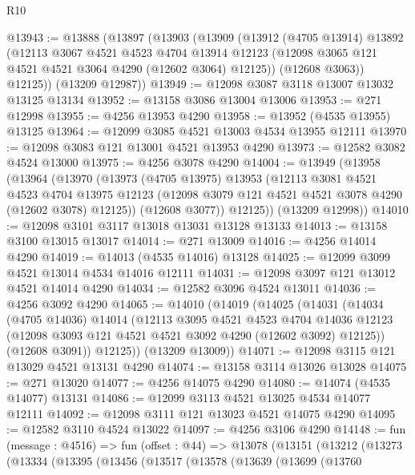 \begin{lexlean}{R10}
\begin{coremodule}
@13943 := @13888
    (@13897
      (@13903
        (@13909
          (@13912
            (@4705 @13914)
            @13892
            (@12113
              @3067
              @4521
              @4523
              @4704
              @13914
              @12123
              (@12098 @3065 @121 @4521 @4521 @3064 @4290 (@12602 @3064) @12125))
            (@12608 @3063))
          @12125))
      (@13209 @12987))
@13949 := @12098 @3087 @3118 @13007 @13032 @13125 @13134
@13952 := @13158 @3086 @13004 @13006
@13953 := @271 @12998
@13955 := @4256 @13953 @4290
@13958 := @13952 (@4535 @13955) @13125
@13964 := @12099 @3085 @4521 @13003 @4534 @13955 @12111
@13970 := @12098 @3083 @121 @13001 @4521 @13953 @4290
@13973 := @12582 @3082 @4524 @13000
@13975 := @4256 @3078 @4290
@14004 := @13949
    (@13958
      (@13964
        (@13970
          (@13973
            (@4705 @13975)
            @13953
            (@12113
              @3081
              @4521
              @4523
              @4704
              @13975
              @12123
              (@12098 @3079 @121 @4521 @4521 @3078 @4290 (@12602 @3078) @12125))
            (@12608 @3077))
          @12125))
      (@13209 @12998))
@14010 := @12098 @3101 @3117 @13018 @13031 @13128 @13133
@14013 := @13158 @3100 @13015 @13017
@14014 := @271 @13009
@14016 := @4256 @14014 @4290
@14019 := @14013 (@4535 @14016) @13128
@14025 := @12099 @3099 @4521 @13014 @4534 @14016 @12111
@14031 := @12098 @3097 @121 @13012 @4521 @14014 @4290
@14034 := @12582 @3096 @4524 @13011
@14036 := @4256 @3092 @4290
@14065 := @14010
    (@14019
      (@14025
        (@14031
          (@14034
            (@4705 @14036)
            @14014
            (@12113
              @3095
              @4521
              @4523
              @4704
              @14036
              @12123
              (@12098 @3093 @121 @4521 @4521 @3092 @4290 (@12602 @3092) @12125))
            (@12608 @3091))
          @12125))
      (@13209 @13009))
@14071 := @12098 @3115 @121 @13029 @4521 @13131 @4290
@14074 := @13158 @3114 @13026 @13028
@14075 := @271 @13020
@14077 := @4256 @14075 @4290
@14080 := @14074 (@4535 @14077) @13131
@14086 := @12099 @3113 @4521 @13025 @4534 @14077 @12111
@14092 := @12098 @3111 @121 @13023 @4521 @14075 @4290
@14095 := @12582 @3110 @4524 @13022
@14097 := @4256 @3106 @4290
@14148 := fun (message : @4516) =>
  fun (offset : @44) =>
  @13078
    (@13151
      (@13212
        (@13273
          (@13334
            (@13395
              (@13456
                (@13517
                  (@13578
                    (@13639
                      (@13699
                        (@13760

\end{coremodule}
\end{lexlean}
